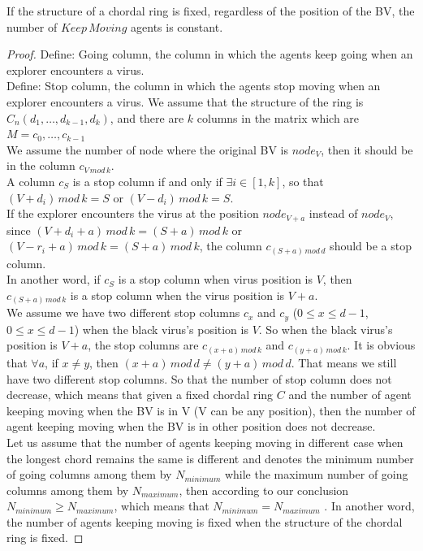  \begin{theorem}
If the structure of a chordal ring is fixed, regardless of the position of the BV, the number of $Keep\,Moving$ agents is constant.
\end{theorem}
\begin{proof}


Define: Going column, the column in which the agents keep going when an explorer encounters a virus.\\
Define: Stop column, the column in which the agents stop moving when an explorer encounters a virus.
We assume that the structure of the ring is $C_n(d_1, \dots, d_{k-1}, d_k)$, and there are $k$ columns in the matrix which are $M={c_0, \dots, c_{k-1}}$\\
We assume the number of node where the original BV is $node_V$, then it should be in the column $c_{V\,mod\,k}$.\\
A column $c_S$ is a stop column if and only if $\exists i\in [1,k]$, so that $(V+d_i)\,mod\,k=S$ or $(V-d_i)\,mod\,k=S$.\\
If the explorer encounters the virus at the position $node_{V+a}$ instead of $node_V$, since $(V+d_i+a)\,mod\,k=(S+a)\,mod\,k$ or $(V-r_i+a)\,mod\,k=(S+a)\,mod\,k$, the column $c_{(S+a)\,mod\,d}$ should be a stop column.\\
In another word, if $c_S$ is a stop column when virus position is $V$, then $c_{(S+a)\,mod\,k}$ is a stop column when the virus position is $V+a$.\\
We assume we have two different stop columns $c_x$ and $c_y$ ($0\leq x\leq d-1$, $0\leq x\leq d-1$) when the black virus's position is $V$.  So when the black virus's position is $V+a$, the stop columns are $c_{(x+a)\,mod\,k}$ and $c_{(y+a)\,mod\,k}$. It is obvious that $\forall a$, if $x\neq y$, then $(x+a)\,mod\,d\neq(y+a)\,mod\,d$. That means we still have two different stop columns. So that the number of stop column does not decrease, which means that given a fixed chordal ring $C$ and the number of agent keeping moving when the BV is in V (V can be any position), then the number of agent keeping moving when the BV is in other position does not decrease.\\
Let us assume that the number of agents keeping moving in different case when the longest chord remains the same is different and denotes the minimum number of going columns among them by $N_{minimum}$ while the maximum number of going columns among them by $N_{maximum}$, then according to our conclusion $N_{minimum}\geq N_{maximum}$, which means that $N_{minimum}= N_{maximum}$ . In another word, the number of agents keeping moving is fixed when the structure of the chordal ring is fixed. 
\end{proof}

